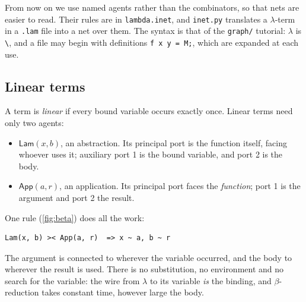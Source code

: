 \documentclass[11pt,a4paper]{article}
\newcommand{\ag}[1]{\mathsf{#1}}
\newcommand{\Lam}{\ag{Lam}}
\newcommand{\App}{\ag{App}}
\theoremstyle{definition}
\theoremstyle{plain}
\begin{document}
From now on we use named agents rather than the combinators, so that nets
are easier to read. Their rules are in \texttt{lambda.inet}, and
\texttt{inet.py} translates a $\lambda$-term in a \texttt{.lam} file into a
net over them. The syntax is that of the \texttt{graph/} tutorial: $\lambda$
is \verb|\|, and a file may begin with definitions \texttt{f x y = M;}, which
are expanded at each use.

\subsection{Linear terms}

A term is \emph{linear} if every bound variable occurs exactly once. Linear
terms need only two agents:
\begin{itemize}[itemsep=2pt]
\item $\Lam(x, b)$, an abstraction. Its principal port is the function
  itself, facing whoever uses it; auxiliary port 1 is the bound variable,
  and port 2 is the body.
\item $\App(a, r)$, an application. Its principal port faces the
  \emph{function}; port 1 is the argument and port 2 the result.
\end{itemize}
One rule (\cref{fig:beta}) does all the work:
\begin{lstlisting}
Lam(x, b) >< App(a, r)  => x ~ a, b ~ r
\end{lstlisting}
The argument is connected to wherever the variable occurred, and the body to
wherever the result is used. There is no substitution, no environment and no
search for the variable: the wire from $\lambda$ to its variable \emph{is}
the binding, and $\beta$-reduction takes constant time, however large the
body.
\end{document}
